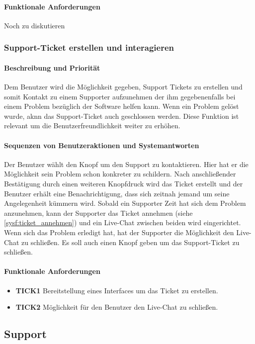 \paragraph{Funktionale Anforderungen}
Noch zu diskutieren

\subsubsection{Support-Ticket erstellen und interagieren}
\label{sysf:ticket_erstellen}
\paragraph{Beschreibung und Priorität}
Dem Benutzer wird die Möglichkeit gegeben, Support Tickets zu erstellen und somit Kontakt zu einem Supporter aufzunehmen der ihm gegebenenfalls bei einem Problem bezüglich der Software helfen kann. Wenn ein Problem gelöst wurde, aknn das Support-Ticket auch geschlossen werden. Diese Funktion ist relevant um die Benutzerfreundlichkeit weiter zu erhöhen.
\paragraph{Sequenzen von Benutzeraktionen und Systemantworten}
Der Benutzer wählt den Knopf um den Support zu kontaktieren. Hier hat er die Möglichkeit sein Problem schon konkreter zu schildern. Nach anschließender Bestätigung durch einen weiteren Knopfdruck wird das Ticket erstellt und der Benutzer erhält eine Benachrichtigung, dass sich zeitnah jemand um seine Angelegenheit kümmern wird. Sobald ein Supporter Zeit hat sich dem Problem anzunehmen, kann der Supporter das Ticket annehmen (siehe \ref{sysf:ticket_annehmen}) und ein Live-Chat zwischen beiden wird eingerichtet. Wenn sich das Problem erledigt hat, hat der Supporter die Möglichkeit den Live-Chat zu schließen. Es soll auch einen Knopf geben um das Support-Ticket zu schließen.
\paragraph{Funktionale Anforderungen}
\begin{itemize}
\item \textbf{TICK1} Bereitstellung eines Interfaces um das Ticket zu erstellen.
\item \textbf{TICK2} Möglichkeit für den Benutzer den Live-Chat zu schließen.
\end{itemize}


\subsection{Support}
